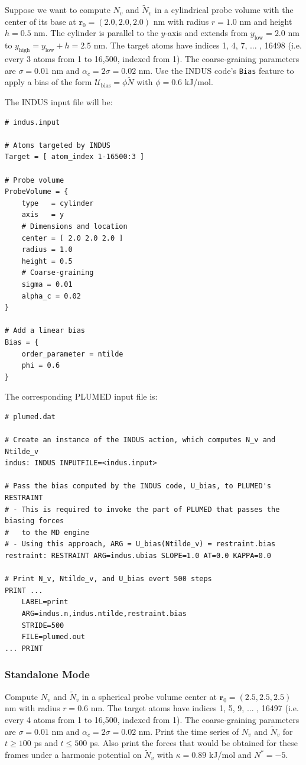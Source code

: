 \documentclass[11pt,notitlepage]{article}
\begin{document}
Suppose we want to compute $N_v$ and $\tilde{N}_v$ in a cylindrical probe volume with the center of its base at $\mathbf{r}_0 = (2.0, 2.0, 2.0)$ nm with radius $r = 1.0$ nm and height $h = 0.5$ nm. The cylinder is parallel to the $y$-axis and extends from $y_{\text{low}} = 2.0$ nm to $y_{\text{high}} = y_{\text{low}} + h = 2.5$ nm. The target atoms have indices 1, 4, 7, ... , 16498 (i.e. every 3 atoms from 1 to 16,500, indexed from 1). The coarse-graining parameters are $\sigma = 0.01$ nm and $\alpha_c = 2 \sigma = 0.02$ nm. Use the INDUS code's \texttt{Bias} feature to apply a bias of the form $\mathcal{U}_{\text{bias}} = \phi \tilde{N}$ with $\phi = 0.6$ kJ/mol.

The INDUS input file will be:
\begin{lstlisting}
# indus.input

# Atoms targeted by INDUS
Target = [ atom_index 1-16500:3 ]

# Probe volume
ProbeVolume = {
	type   = cylinder
	axis   = y
	# Dimensions and location
	center = [ 2.0 2.0 2.0 ]
	radius = 1.0
	height = 0.5
	# Coarse-graining
	sigma = 0.01
	alpha_c = 0.02
}

# Add a linear bias
Bias = {
	order_parameter = ntilde
	phi = 0.6
}
\end{lstlisting}

\noindent The corresponding PLUMED input file is:
\begin{lstlisting}
# plumed.dat

# Create an instance of the INDUS action, which computes N_v and Ntilde_v
indus: INDUS INPUTFILE=<indus.input>

# Pass the bias computed by the INDUS code, U_bias, to PLUMED's RESTRAINT
# - This is required to invoke the part of PLUMED that passes the biasing forces 
#   to the MD engine
# - Using this approach, ARG = U_bias(Ntilde_v) = restraint.bias
restraint: RESTRAINT ARG=indus.ubias SLOPE=1.0 AT=0.0 KAPPA=0.0

# Print N_v, Ntilde_v, and U_bias evert 500 steps
PRINT ...
	LABEL=print
	ARG=indus.n,indus.ntilde,restraint.bias
	STRIDE=500
	FILE=plumed.out
... PRINT
\end{lstlisting}


\subsubsection{Standalone Mode}

Compute $N_v$ and $\tilde{N}_v$ in a spherical probe volume center at $\mathbf{r}_0 = (2.5, 2.5, 2.5)$ nm with radius $r = 0.6$ nm. The target atoms have indices 1, 5, 9, ... , 16497 (i.e. every 4 atoms from 1 to 16,500, indexed from 1). The coarse-graining parameters are $\sigma = 0.01$ nm and $\alpha_c = 2 \sigma = 0.02$ nm. Print the time series of $N_v$ and $\tilde{N}_v$ for $t \ge 100$ ps and $t \le 500$ ps. Also print the forces that would be obtained for these frames under a harmonic potential on $\tilde{N}_v$ with $\kappa = 0.89$ kJ/mol and $N^* = -5$.
\end{document}
